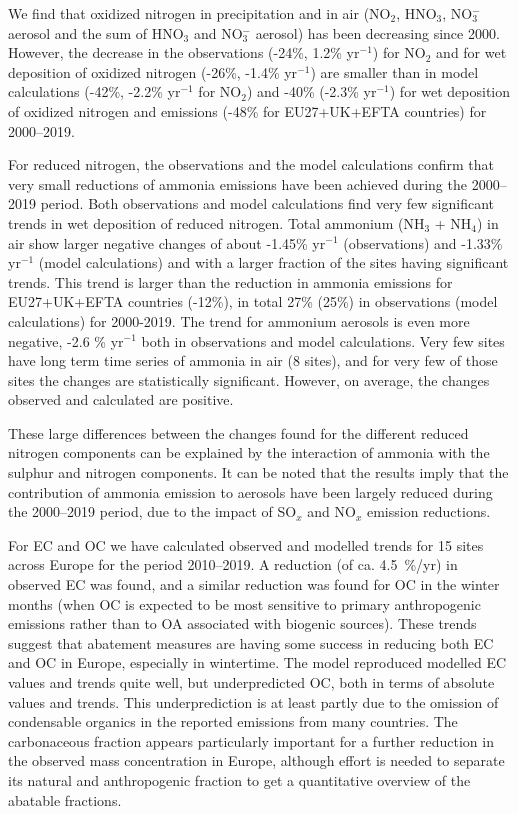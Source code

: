 We find that oxidized nitrogen in precipitation and in air (NO$_2$, HNO$_3$, NO$_3^{-}$ aerosol and the sum of HNO$_3$ and NO$_3^{-}$ aerosol) has been decreasing since 2000. However, the decrease in the observations (-24\%, 1.2\% yr$^{-1}$) for NO$_2$ and for wet deposition of oxidized nitrogen (-26\%, -1.4\% yr$^{-1}$) are smaller than in model calculations (-42\%, -2.2\% yr$^{-1}$ for NO$_2$) and -40\% (-2.3\% yr$^{-1}$) for wet deposition of oxidized nitrogen  and emissions (-48\% for EU27+UK+EFTA countries) for 2000--2019.

For reduced nitrogen, the observations and the model calculations confirm that very small reductions of ammonia emissions have been achieved during the 2000--2019 period. 
Both observations and model calculations find very few significant trends in wet deposition of reduced nitrogen.
Total ammonium (NH$_3$ + NH$_4$) in air show larger negative changes of about -1.45\% yr$^{-1}$ (observations) and -1.33\% yr$^{-1}$ (model calculations) and with a larger fraction of the sites having significant trends. This trend is larger than the reduction in ammonia emissions for EU27+UK+EFTA countries (-12\%), in total 27\% (25\%) in observations (model calculations) for 2000-2019. The trend for ammonium aerosols is even more negative, -2.6 \% yr$^{-1}$ both in observations and model calculations. Very few sites have long term time series of ammonia in air (8 sites), and for very few of those sites the changes are statistically significant. However, on average, the changes observed and calculated are positive. 

These large differences between the changes found for the different reduced nitrogen components can be explained by the interaction of ammonia with the sulphur and nitrogen components. It can be noted that the results imply that the contribution of ammonia emission to aerosols have been largely reduced during the 2000--2019 period, due to the impact of SO$_x$ and NO$_x$ emission reductions. 



For EC and OC we have calculated observed and modelled trends for 15 sites across Europe for the period 2010--2019. A reduction (of ca. 4.5~\%/yr) in observed EC was found, and a similar reduction was found for OC in the winter months (when OC is expected to be most sensitive to primary anthropogenic emissions rather than to OA associated with biogenic sources). These trends suggest that abatement measures are having some success in reducing both EC and OC in Europe, especially in wintertime.  The model reproduced modelled EC values and trends quite well, but underpredicted OC, both in terms of absolute values and trends. This underprediction is at least partly due to the omission of condensable organics in the reported emissions from many countries. 
%
The carbonaceous fraction appears particularly important for a
further reduction in the observed \pmfine mass concentration in Europe,
although effort is needed to separate its natural and anthropogenic
fraction to get a quantitative overview of the abatable fractions.


